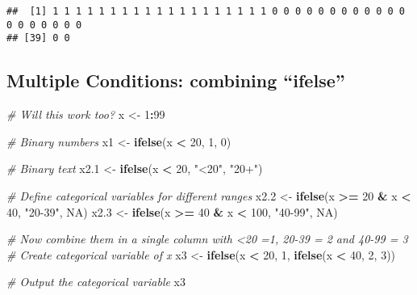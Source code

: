 \documentclass[
]{article}
\newenvironment{Shaded}{\begin{snugshade}}{\end{snugshade}}
\newcommand{\CommentTok}[1]{\textcolor[rgb]{0.56,0.35,0.01}{\textit{#1}}}
\newcommand{\ConstantTok}[1]{\textcolor[rgb]{0.56,0.35,0.01}{#1}}
\newcommand{\DecValTok}[1]{\textcolor[rgb]{0.00,0.00,0.81}{#1}}
\newcommand{\FloatTok}[1]{\textcolor[rgb]{0.00,0.00,0.81}{#1}}
\newcommand{\FunctionTok}[1]{\textcolor[rgb]{0.13,0.29,0.53}{\textbf{#1}}}
\newcommand{\NormalTok}[1]{#1}
\newcommand{\OtherTok}[1]{\textcolor[rgb]{0.56,0.35,0.01}{#1}}
\newcommand{\SpecialCharTok}[1]{\textcolor[rgb]{0.81,0.36,0.00}{\textbf{#1}}}
\newcommand{\StringTok}[1]{\textcolor[rgb]{0.31,0.60,0.02}{#1}}
\begin{document}
\begin{verbatim}
##  [1] 1 1 1 1 1 1 1 1 1 1 1 1 1 1 1 1 1 1 1 0 0 0 0 0 0 0 0 0 0 0 0 0 0 0 0 0 0 0
## [39] 0 0
\end{verbatim}

\subsection{Multiple Conditions: combining
``ifelse''}\label{multiple-conditions-combining-ifelse}

\begin{Shaded}
\begin{Highlighting}[]
\CommentTok{\# Will this work too?}
\NormalTok{x }\OtherTok{\textless{}{-}} \DecValTok{1}\SpecialCharTok{:}\DecValTok{99}

\CommentTok{\# Binary numbers}
\NormalTok{x1 }\OtherTok{\textless{}{-}} \FunctionTok{ifelse}\NormalTok{(x }\SpecialCharTok{\textless{}} \DecValTok{20}\NormalTok{, }\DecValTok{1}\NormalTok{, }\DecValTok{0}\NormalTok{) }

\CommentTok{\# Binary text}
\NormalTok{x2}\FloatTok{.1} \OtherTok{\textless{}{-}} \FunctionTok{ifelse}\NormalTok{(x }\SpecialCharTok{\textless{}} \DecValTok{20}\NormalTok{, }\StringTok{"\textless{}20"}\NormalTok{, }\StringTok{"20+"}\NormalTok{)  }

\CommentTok{\# Define categorical variables for different ranges}
\NormalTok{x2}\FloatTok{.2} \OtherTok{\textless{}{-}} \FunctionTok{ifelse}\NormalTok{(x }\SpecialCharTok{\textgreater{}=} \DecValTok{20} \SpecialCharTok{\&}\NormalTok{ x }\SpecialCharTok{\textless{}} \DecValTok{40}\NormalTok{, }\StringTok{"20{-}39"}\NormalTok{, }\ConstantTok{NA}\NormalTok{)  }
\NormalTok{x2}\FloatTok{.3} \OtherTok{\textless{}{-}} \FunctionTok{ifelse}\NormalTok{(x }\SpecialCharTok{\textgreater{}=} \DecValTok{40} \SpecialCharTok{\&}\NormalTok{ x }\SpecialCharTok{\textless{}} \DecValTok{100}\NormalTok{, }\StringTok{"40{-}99"}\NormalTok{, }\ConstantTok{NA}\NormalTok{)  }

\CommentTok{\# Now combine them in a single column with \textless{}20 =1, 20{-}39 = 2 and 40{-}99 = 3}
\CommentTok{\# Create categorical variable of x}
\NormalTok{x3 }\OtherTok{\textless{}{-}} \FunctionTok{ifelse}\NormalTok{(x }\SpecialCharTok{\textless{}} \DecValTok{20}\NormalTok{, }\DecValTok{1}\NormalTok{, }\FunctionTok{ifelse}\NormalTok{(x }\SpecialCharTok{\textless{}} \DecValTok{40}\NormalTok{, }\DecValTok{2}\NormalTok{, }\DecValTok{3}\NormalTok{))}

\CommentTok{\# Output the categorical variable}
\NormalTok{x3}
\end{Highlighting}
\end{Shaded}
\end{document}
